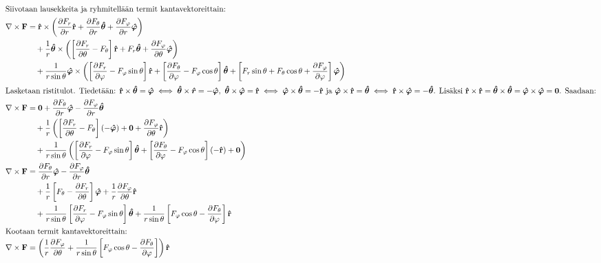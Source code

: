 \documentclass[../johdoksia.tex]{subfiles}
\begin{document}
\begin{enumerate}
\begin{align}
			\intertext{Siivotaan lausekkeita ja ryhmitellään termit kantavektoreittain:}
			\curlop\vtr{F} &= \unitv{r}\times\left(\pdv{F_r}{r}\unitv{r} + \pdv{F_\theta}{r}\unitg{\theta} + \pdv{F_\varphi}{r}\unitg{\varphi}\right) \\
			&\quad + \frac{1}{r}\unitg{\theta}\times\left(\left[\pdv{F_r}{\theta} - F_\theta\right]\unitv{r} + F_r\unitg{\theta} + \pdv{F_\varphi}{\theta}\unitg{\varphi}\right) \\
			&\quad + \frac{1}{r\sin\theta}\unitg{\varphi}\times\left(\left[\pdv{F_r}{\varphi} - F_\varphi\sin\theta\right]\unitv{r} + \left[\pdv{F_\theta}{\varphi} - F_\varphi\cos\theta\right]\unitg{\theta} + \left[F_r\sin\theta + F_\theta\cos\theta + \pdv{F_\varphi}{\varphi}\right]\unitg{\varphi}\right) \\
			\intertext{Lasketaan ristitulot. Tiedetään: $\unitv{r}\times\unitg{\theta} = \unitg{\varphi} \iff \unitg{\theta} \times \unitg{r} = -\unitg{\varphi}, \ \unitg{\theta} \times \unitg{\varphi} = \unitv{r} \iff \unitg{\varphi} \times \unitg{\theta} = -\unitv{r}$ ja $\unitg{\varphi} \times \unitv{r} = \unitg{\theta} \iff \unitv{r} \times \unitg{\varphi} = -\unitg{\theta}$. Lisäksi $\unitv{r} \times \unitv{r} = \unitg{\theta} \times \unitg{\theta} = \unitg{\varphi} \times \unitg{\varphi} = \vtr{0}$. Saadaan:}
			\curlop\vtr{F} &= \vtr{0} + \pdv{F_\theta}{r}\unitg{\varphi} - \pdv{F_\varphi}{r}\unitg{\theta} \\
			&\quad + \frac{1}{r}\left(\left[\pdv{F_r}{\theta} - F_\theta\right](-\unitg{\varphi}) + \vtr{0} + \pdv{F_\varphi}{\theta}\unitv{r}\right) \\
			&\quad + \frac{1}{r\sin\theta}\left(\left[\pdv{F_r}{\varphi} - F_\varphi\sin\theta\right]\unitg{\theta} + \left[\pdv{F_\theta}{\varphi} - F_\varphi\cos\theta\right](-\unitv{r}) + \vtr{0}\right) \\
			\curlop\vtr{F} &= \pdv{F_\theta}{r}\unitg{\varphi} - \pdv{F_\varphi}{r}\unitg{\theta} \\
			&\quad + \frac{1}{r}\left[F_\theta - \pdv{F_r}{\theta}\right]\unitg{\varphi} + \frac{1}{r}\pdv{F_\varphi}{\theta}\unitv{r} \\
			&\quad + \frac{1}{r\sin\theta}\left[\pdv{F_r}{\varphi} - F_\varphi\sin\theta\right]\unitg{\theta} + \frac{1}{r\sin\theta}\left[F_\varphi\cos\theta - \pdv{F_\theta}{\varphi}\right]\unitv{r} \\
			\intertext{Kootaan termit kantavektoreittain:}
			\curlop\vtr{F} &= \left(\frac{1}{r}\pdv{F_\varphi}{\theta} + \frac{1}{r\sin\theta}\left[F_\varphi\cos\theta - \pdv{F_\theta}{\varphi}\right]\right)\unitv{r} \\

\end{align}
\end{enumerate}
\end{document}
